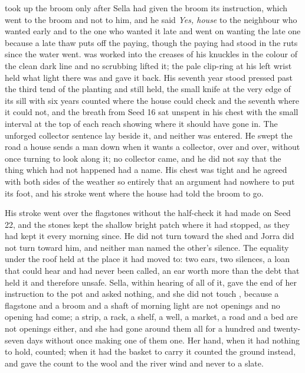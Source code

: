  took up the broom only after Sella had given the broom its instruction, which went to the broom and not to him, and he said \emph{Yes, house} to the neighbour who wanted  early and to the one who wanted it late and went on wanting the late one because a late thaw puts off the paying, though the paying had stood in the ruts since the water went.  was worked into the creases of his knuckles in the colour of the clean dark line and no scrubbing lifted it; the pale clip-ring at his left wrist held what light there was and gave it back. His seventh year stood pressed past the third tend of the planting and still held, the small knife at the very edge of its sill with six years counted where the house could check and the seventh where it could not, and the breath from Seed 16 sat unspent in his chest with the small interval at the top of each reach showing where it should have gone in. The unforged collector sentence lay beside it, and neither was entered. He swept the road a house sends a man down when it wants a collector, over and over, without once turning to look along it; no collector came, and he did not say that the thing which had not happened had a name. His chest was tight and he agreed with both sides of the weather so entirely that an argument had nowhere to put its foot, and his stroke went where the house had told the broom to go.

His stroke went over the flagstones without the half-check it had made on Seed 22, and the stones kept the shallow bright patch where it had stopped, as they had kept it every morning since. He did not turn toward the shed and Jorra did not turn toward him, and neither man named the other's silence. The equality under the roof held at the place it had moved to: two ears, two silences, a loan that could hear and had never been called, an ear worth more than the debt that held it and therefore unsafe. Sella, within hearing of all of it, gave the end of her instruction to the pot and asked nothing, and she did not touch , because a flagstone and a broom and a shaft of morning light are not openings and no opening had come; a strip, a rack, a shelf, a well, a market, a road and a bed are not openings either, and she had gone around them all for a hundred and twenty-seven days without once making one of them one. Her hand, when it had nothing to hold, counted; when it had the basket to carry it counted the ground instead, and gave the count to the wool and the river wind and never to a slate.

